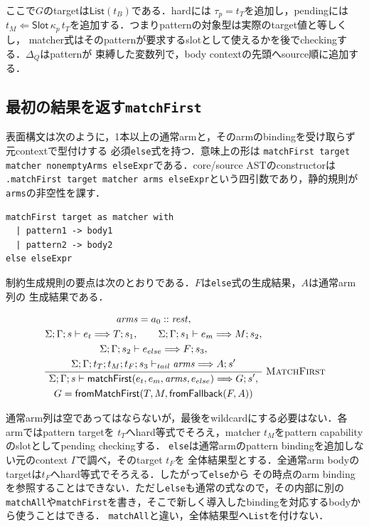 \documentclass[11pt,a4paper,oneside]{ltjsbook}
\newcommand{\code}[1]{\texttt{#1}}
\newcommand{\checks}{\mathrel{\Leftarrow}}
\newcommand{\Slot}{\mathsf{Slot}}
\begin{document}
ここで$G$のtargetは$\mathsf{List}(t_B)$である．hardには
$\tau_p=t_T$を追加し，pendingには
$t_M\checks\Slot\,\kappa_p\,t_T$を追加する．つまりpatternの対象型は実際のtarget値と等しくし，
matcher式はそのpatternが要求するslotとして使えるかを後でcheckingする．$\Delta_Q$はpatternが
束縛した変数列で，body contextの先頭へsource順に追加する．

\subsection{最初の結果を返す\code{matchFirst}}

表面構文は次のように，1本以上の通常armと，そのarmのbindingを受け取らず元contextで型付けする
必須\code{else}式を持つ．意味上の形は
\code{matchFirst target matcher nonemptyArms elseExpr}である．core/source ASTのconstructorは
\code{.matchFirst target matcher arms elseExpr}という四引数であり，静的規則が\code{arms}の非空性を課す．

\begin{lstlisting}
matchFirst target as matcher with
  | pattern1 -> body1
  | pattern2 -> body2
else elseExpr
\end{lstlisting}

制約生成規則の要点は次のとおりである．$F$は\code{else}式の生成結果，$A$は通常arm列の
生成結果である．

\[
\frac{
  \begin{gathered}
  \mathit{arms}=a_0::\mathit{rest},\\
  \Sigma;\Gamma;s\vdash e_t\Longrightarrow T;s_1,\qquad
  \Sigma;\Gamma;s_1\vdash e_m\Longrightarrow M;s_2,\\
  \Sigma;\Gamma;s_2\vdash e_{else}\Longrightarrow F;s_3,\\
  \Sigma;\Gamma;t_T;t_M;t_F;s_3\vdash_{tail}\mathit{arms}
    \Longrightarrow A;s'
  \end{gathered}
}{
  \begin{gathered}
  \Sigma;\Gamma;s\vdash
    \mathsf{matchFirst}(e_t,e_m,\mathit{arms},e_{else})
      \Longrightarrow G;s',\\
  G=\mathsf{fromMatchFirst}(T,M,\mathsf{fromFallback}(F,A))
  \end{gathered}
}\;\textsc{MatchFirst}
\]

通常arm列は空であってはならないが，最後をwildcardにする必要はない．各armではpattern targetを
$t_T$へhard等式でそろえ，matcher $t_M$をpattern capabilityのslotとしてpending checkingする．
\code{else}は通常armのpattern bindingを追加しない元のcontext $\Gamma$で調べ，そのtarget $t_F$を
全体結果型とする．全通常arm bodyのtargetは$t_F$へhard等式でそろえる．したがって\code{else}から
その時点のarm bindingを参照することはできない．ただし\code{else}も通常の式なので，その内部に別の
\code{matchAll}や\code{matchFirst}を書き，そこで新しく導入したbindingを対応するbodyから使うことはできる．
\code{matchAll}と違い，全体結果型へ\code{List}を付けない．
\end{document}
